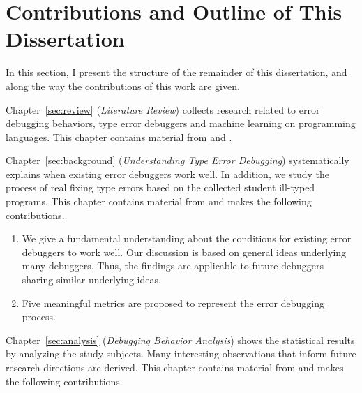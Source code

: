 \documentclass[12pt]{report}	%
\begin{document}
\section{Contributions and Outline of This Dissertation}

In this section, I present the structure of the remainder of this dissertation,
and along the way the contributions of this work are given.

Chapter~\ref{sec:review} (\emph{Literature Review}) collects research related to error debugging behaviors,  
type error debuggers and machine learning on programming languages.
This chapter contains material from \cite{wu2017type} and \cite{wu2017learning}.

Chapter~\ref{sec:background} (\emph{Understanding Type Error Debugging}) systematically explains when existing error debuggers work well.
%
In addition, we study the process of real fixing type errors based on the collected student ill-typed programs.
This chapter contains material from \cite{wu2017type} and makes the following contributions.

\begin{enumerate}
\item We give a fundamental understanding about the conditions for existing error debuggers to work well.
Our discussion is based on general ideas underlying many debuggers.
Thus, the findings are applicable to future debuggers sharing similar underlying ideas.

\item Five meaningful metrics are proposed to represent the error debugging process.
\end{enumerate}



Chapter~\ref{sec:analysis} (\emph{Debugging Behavior Analysis}) shows the statistical results by analyzing the study subjects.
Many interesting observations that inform future research directions are derived.
This chapter contains material from \cite{wu2017type} and makes the following contributions.
\end{document}

